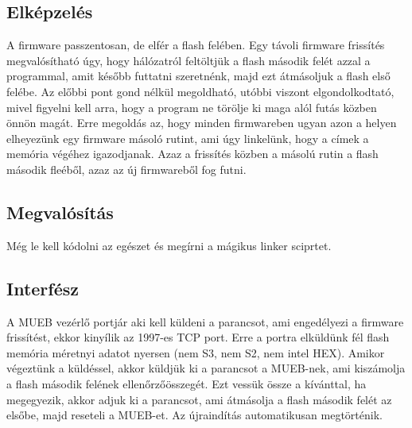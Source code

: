 \subsection{Elképzelés}
A firmware passzentosan, de elfér a flash felében. Egy távoli firmware frissítés megvalósítható úgy, hogy hálózatról feltöltjük a flash második felét azzal a programmal, amit később futtatni szeretnénk, majd ezt átmásoljuk a flash első felébe. Az előbbi pont gond nélkül megoldható, utóbbi viszont elgondolkodtató, mivel figyelni kell arra, hogy a program ne törölje ki maga alól futás közben önnön magát. Erre megoldás az, hogy minden firmwareben ugyan azon a helyen elheyezünk egy firmware másoló rutint, ami úgy linkelünk, hogy a címek a memória végéhez igazodjanak. Azaz a frissítés közben a másolú rutin a flash második fleéből, azaz az új firmwareből fog futni. 


\subsection{Megvalósítás} %
Még le kell kódolni az egészet és megírni a mágikus linker sciprtet.

\subsection{Interfész} %
A MUEB vezérlő portjár aki kell küldeni a parancsot, ami engedélyezi a firmware frissítést, ekkor kinyílik az 1997-es TCP port. Erre a portra elküldünk fél flash memória méretnyi adatot nyersen (nem S3, nem S2, nem intel HEX). Amikor végeztünk a küldéssel, akkor küldjük ki a parancsot a MUEB-nek, ami kiszámolja a flash második felének ellenőrzőösszegét. Ezt vessük össze a kívánttal, ha megegyezik, akkor adjuk ki a parancsot, ami átmásolja a flash második felét az elsőbe, majd reseteli a MUEB-et. Az újraindítás automatikusan megtörténik. 
